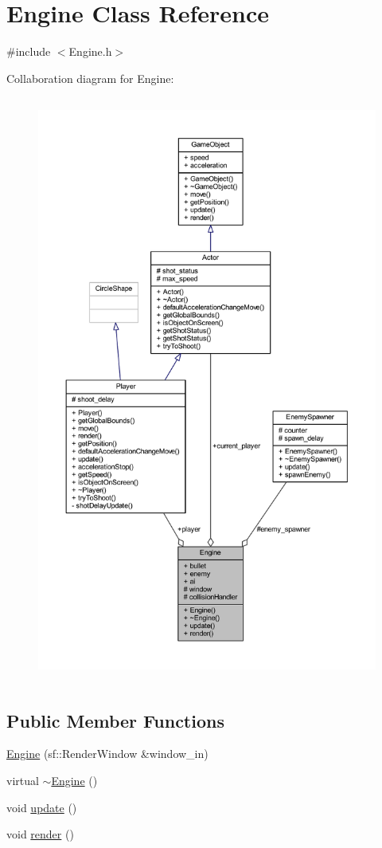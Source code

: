 \hypertarget{class_engine}{}\section{Engine Class Reference}
\label{class_engine}


{\ttfamily \#include $<$Engine.\+h$>$}



Collaboration diagram for Engine\+:\nopagebreak
\begin{figure}[H]
\begin{center}
\leavevmode
\includegraphics[height=550pt]{class_engine__coll__graph}
\end{center}
\end{figure}
\subsection*{Public Member Functions}
\begin{DoxyCompactItemize}
\item 
\hyperlink{class_engine_a74e8b812fd1bac60a35aaead9c3e81f8}{Engine} (sf\+::\+Render\+Window \&window\+\_\+in)
\item 
virtual \hyperlink{class_engine_a8ef7030a089ecb30bbfcb9e43094717a}{$\sim$\+Engine} ()
\item 
void \hyperlink{class_engine_ad2ff110d5a86c1cd60b541d65915ac48}{update} ()
\item 
void \hyperlink{class_engine_a7960743aefd62e846e7f3cd92c18bc73}{render} ()
\end{DoxyCompactItemize}
